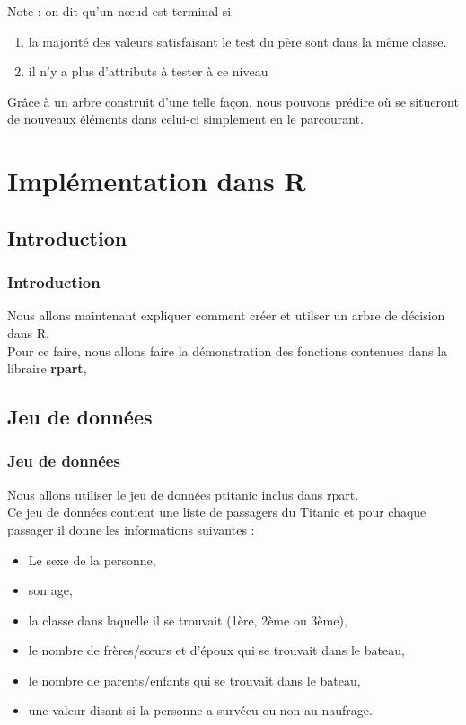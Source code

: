 \documentclass[compress]{beamer}
\begin{document}
\begin{frame}
Note : on dit qu'un nœud est terminal si 
\begin{enumerate}
\item la majorité des valeurs satisfaisant le test du père sont dans la même classe.
\item il n'y a plus d'attributs à tester à ce niveau
\end{enumerate}

Grâce à un arbre construit d'une telle façon, nous pouvons prédire où se situeront de nouveaux éléments dans celui-ci simplement en le parcourant.
\end{frame}

\section{Implémentation dans R}
\subsection{Introduction}
\begin{frame}
\frametitle{Introduction}
Nous allons maintenant expliquer comment créer et utilser un arbre de décision dans R.\\
Pour ce faire, nous allons faire la démonstration des fonctions contenues dans la libraire \textbf{rpart}, 
\end{frame}
\subsection{Jeu de données}
\begin{frame}
\frametitle{Jeu de données}
Nous allons utiliser le jeu de données \textrm{ptitanic} inclus dans \textrm{rpart}.\\
Ce jeu de données contient une liste de passagers du Titanic et pour chaque passager il donne les informations suivantes :\newline
\begin{itemize}
 \item Le sexe de la personne,
 \item son age,
 \item la classe dans laquelle il se trouvait (1ère, 2ème ou 3ème),
 \item le nombre de frères/sœurs et d'époux qui se trouvait dans le bateau,
 \item le nombre de parents/enfants qui se trouvait dans le bateau,
 \item une valeur disant si la personne a survécu ou non au naufrage.
\end{itemize}
\end{frame}
\end{document}
